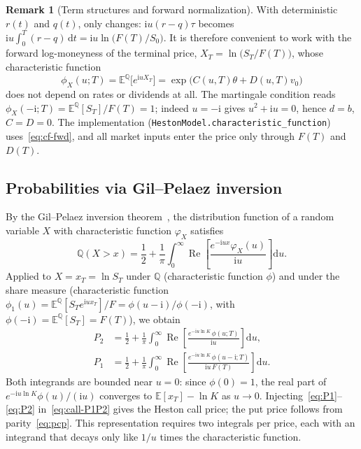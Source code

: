 \documentclass[11pt,a4paper]{article}
\theoremstyle{plain}
\theoremstyle{definition}
\newtheorem{remark}[theorem]{Remark}
\newcommand{\dd}{\mathrm{d}}
\newcommand{\E}{\mathbb{E}}
\newcommand{\Q}{\mathbb{Q}}
\newcommand{\Real}{\operatorname{Re}}
\newcommand{\iu}{\mathrm{i}}
\begin{document}
\begin{remark}[Term structures and forward normalization]\label{rem:fwd-cf}
With deterministic $r(t)$ and $q(t)$, only changes: $\iu u(r-q)\tau$ becomes $\iu u\int_0^T(r-q)\,\dd t=\iu u\ln\bigl(F(T)/S_0\bigr)$. It is therefore convenient to work with the forward log-moneyness of the terminal price, $X_T=\ln\bigl(S_T/F(T)\bigr)$, whose characteristic function
\begin{equation}
    \phi_X(u;T)=\E^\Q\bigl[e^{\iu uX_T}\bigr]=\exp\bigl(C(u,T)\theta+D(u,T)v_0\bigr)
    \label{eq:cf-fwd}
\end{equation}
does not depend on rates or dividends at all. The martingale condition reads $\phi_X(-\iu;T)=\E^\Q[S_T]/F(T)=1$; indeed $u=-\iu$ gives $u^2+\iu u=0$, hence $d=b$, $C=D=0$. The implementation (\texttt{HestonModel.characteristic\_function}) uses~\eqref{eq:cf-fwd}, and all market inputs enter the price only through $F(T)$ and $D(T)$.
\end{remark}


\subsection{Probabilities via Gil--Pelaez inversion}
By the Gil--Pelaez inversion theorem~\cite{gilpelaez}, the distribution function of a random variable $X$ with characteristic function $\varphi_X$ satisfies
\begin{equation}
    \Q(X>x)=\frac12+\frac1\pi\int_0^\infty\Real\!\left[\frac{e^{-\iu ux}\varphi_X(u)}{\iu u}\right]\dd u.
\end{equation}
Applied to $X=x_T=\ln S_T$ under $\Q$ (characteristic function $\phi$) and under the share measure (characteristic function $\phi_1(u)=\E^{\Q}[S_Te^{\iu ux_T}]/F=\phi(u-\iu)/\phi(-\iu)$, with $\phi(-\iu)=\E^\Q[S_T]=F(T)$), we obtain
\begin{align}
    P_2 &= \frac12+\frac1\pi\int_0^\infty\Real\!\left[\frac{e^{-\iu u\ln K}\,\phi(u;T)}{\iu u}\right]\dd u,\label{eq:P2}\\
    P_1 &= \frac12+\frac1\pi\int_0^\infty\Real\!\left[\frac{e^{-\iu u\ln K}\,\phi(u-\iu;T)}{\iu u\,F(T)}\right]\dd u.\label{eq:P1}
\end{align}
Both integrands are bounded near $u=0$: since $\phi(0)=1$, the real part of $e^{-\iu u\ln K}\phi(u)/(\iu u)$ converges to $\E[x_T]-\ln K$ as $u\to0$. Injecting~\eqref{eq:P1}--\eqref{eq:P2} in~\eqref{eq:call-P1P2} gives the Heston call price; the put price follows from parity~\eqref{eq:pcp}. This representation requires two integrals per price, each with an integrand that decays only like $1/u$ times the characteristic function.
\end{document}
